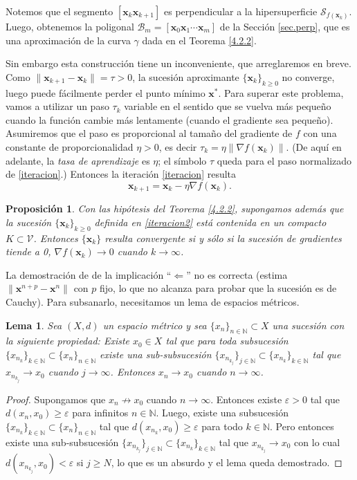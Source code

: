 \documentclass[12pt, a4paper]{amsbook}
\newcommand{\ve}{\varepsilon}
\newcommand{\N}{{\mathbb N}}
\newcommand{\Vc}{{\mathcal V}}
\newcommand{\B}{{\mathcal B}}
\newcommand{\Sw}{{\mathcal S}}
\newcommand{\xx}{{\mathbf x}}
\newtheorem{lema}[teo]{Lema}
\newtheorem{prop}[teo]{Proposici\'on}
\theoremstyle{remark}
\theoremstyle{definition}
\numberwithin{section}{chapter}
\numberwithin{subsection}{section}
\numberwithin{equation}{section}
\numberwithin{figure}{chapter}
\begin{document}
Notemos que el segmento $[\xx_k \xx_{k+1}]$ es perpendicular a la hipersuperficie $\Sw_{f(\xx_k)}$. Luego, obtenemos la poligonal $\B_m=[\xx_0 \xx_1\cdots \xx_m]$ de la Sección \ref{sec.perp}, que es una aproximación de la curva $\gamma$ dada en el Teorema \ref{4.2.2}.

Sin embargo esta construcción tiene un inconveniente, que arreglaremos en breve. Como $\|\xx_{k+1}-\xx_k\|=\tau>0$, la sucesión aproximante $\{\xx_k\}_{k\ge 0}$ no converge, luego puede fácilmente perder el punto mínimo $\xx^*$. Para superar este problema, vamos a utilizar un paso $\tau_k$ variable en el sentido que se vuelva más pequeño cuando la función cambie más lentamente (cuando el gradiente sea pequeño). Asumiremos que el paso es proporcional al tamaño del gradiente de $f$ con una constante de proporcionalidad $\eta>0$, es decir $\tau_k = \eta \|\nabla f(\xx_k)\|$. (De aquí en adelante, la {\em tasa de aprendizaje} es $\eta$; el símbolo $\tau$ queda para el paso normalizado de \eqref{iteracion}.) Entonces la iteración \eqref{iteracion} resulta
\begin{equation}\label{iteracion2}
\xx_{k+1} = \xx_k - \eta \nabla f(\xx_k).
\end{equation}

\begin{prop}\label{converge} Con las hipótesis del Teorema \ref{4.2.2}, supongamos además que la sucesión $\{\xx_k\}_{k\ge 0}$ definida en \eqref{iteracion2} está contenida en un compacto $K\subset\Vc$. Entonces $\{\xx_k\}$ resulta convergente si y sólo si la sucesión de gradientes tiende a 0, $\nabla f(\xx_k)\to 0$ cuando $k\to\infty$.
\end{prop}

La demostración de \cite{Calin} de la implicación ``$\Leftarrow$'' no es correcta (estima $\|\xx^{n+p}-\xx^n\|$ con $p$ fijo, lo que no alcanza para probar que la sucesión es de Cauchy). Para subsanarlo, necesitamos un lema de espacios métricos.

\begin{lema}\label{acumulacion}
Sea $(X, d)$ un espacio métrico y sea $\{x_n\}_{n\in\N}\subset X$ una sucesión con la siguiente propiedad: Existe $x_0\in X$ tal que para toda subsucesión $\{x_{n_k}\}_{k\in\N}\subset \{x_n\}_{n\in\N}$ existe una sub-subsucesión $\{x_{n_{k_j}}\}_{j\in\N}\subset \{x_{n_k}\}_{k\in\N}$ tal que $x_{n_{k_j}}\to x_0$ cuando $j\to\infty$. Entonces $x_n\to x_0$ cuando $n\to\infty$.
\end{lema}

\begin{proof}
Supongamos que $x_n\not\to x_0$ cuando $n\to\infty$. Entonces existe $\ve>0$ tal que $d(x_n, x_0)\ge \ve$ para infinitos $n\in\N$. Luego, existe una subsucesión $\{x_{n_k}\}_{k\in\N}\subset\{x_n\}_{n\in\N}$ tal que $d(x_{n_k}, x_0)\ge \ve$ para todo $k\in\N$. Pero entonces existe una sub-subsucesión $\{x_{n_{k_j}}\}_{j\in\N}\subset \{x_{n_k}\}_{k\in\N}$ tal que $x_{n_{k_j}}\to x_0$ con lo cual $d(x_{n_{k_j}}, x_0)<\ve$ si $j\ge N$, lo que es un absurdo y el lema queda demostrado.
\end{proof}
\end{document}
